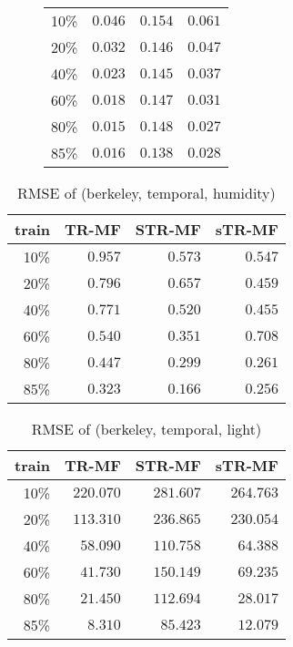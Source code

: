 \begin{figure}[htbp]
{\begin{tabular} {r | r r r}
	10\% & $ \mathbf{ 0.046 } $ & $ 0.154 $ & $ 0.061 $ \\
	20\% & $ \mathbf{ 0.032 } $ & $ 0.146 $ & $ 0.047 $ \\
	40\% & $ \mathbf{ 0.023 } $ & $ 0.145 $ & $ 0.037 $ \\
	60\% & $ \mathbf{ 0.018 } $ & $ 0.147 $ & $ 0.031 $ \\
	80\% & $ \mathbf{ 0.015 } $ & $ 0.148 $ & $ 0.027 $ \\
	85\% & $ \mathbf{ 0.016 } $ & $ 0.138 $ & $ 0.028 $ \\
\end{tabular}
}
\end{figure}





\begin{table} [htbp]
\setlength{\tabcolsep}{2pt}
\centering
\caption{RMSE of (berkeley, temporal, humidity)}
\label{table:spatial_temporal_hum}
\begin{tabular} {r | r r r}
	train	& TR-MF	&	STR-MF	&	sTR-MF	\\ \hline
	10\% & $ 0.957 $ & $ 0.573 $ & $ \mathbf{ 0.547 } $ \\
	20\% & $ 0.796 $ & $ 0.657 $ & $ \mathbf{ 0.459 } $ \\
	40\% & $ 0.771 $ & $ 0.520 $ & $ \mathbf{ 0.455 } $ \\
	60\% & $ 0.540 $ & $ \mathbf{ 0.351 } $ & $ 0.708 $ \\
	80\% & $ 0.447 $ & $ 0.299 $ & $ \mathbf{ 0.261 } $ \\
	85\% & $ 0.323 $ & $ \mathbf{ 0.166 } $ & $ 0.256 $ \\
\end{tabular}
\end{table}

\begin{table} [htbp]
\setlength{\tabcolsep}{2pt}
\centering
\caption{RMSE of (berkeley, temporal, light)}
\label{table:spatial_temporal_light}
\begin{tabular} {r | r r r}
	train	& TR-MF	&	STR-MF	&	sTR-MF	\\ \hline
	10\% & $ \mathbf{ 220.070 } $ & $ 281.607 $ & $ 264.763 $ \\
	20\% & $ \mathbf{ 113.310 } $ & $ 236.865 $ & $ 230.054 $ \\
	40\% & $ \mathbf{ 58.090 } $ & $ 110.758 $ & $ 64.388 $ \\
	60\% & $ \mathbf{ 41.730 } $ & $ 150.149 $ & $ 69.235 $ \\
	80\% & $ \mathbf{ 21.450 } $ & $ 112.694 $ & $ 28.017 $ \\
	85\% & $ \mathbf{ 8.310 } $ & $ 85.423 $ & $ 12.079 $ \\
\end{tabular}
\end{table}


